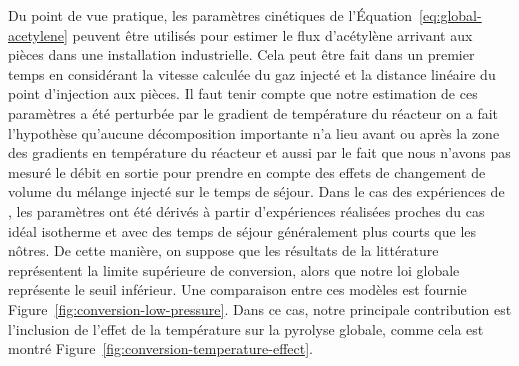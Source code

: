 \begin{table}[h]
  \caption{\label{tab:constantes-globales}Comparaison entre les paramètres de vitesse de décomposition de l'acétylène proposés par \citet{Norinaga2005} et dérivés de cette étude. Vitesse globale de décomposition $\dot{\omega}_{\ch{C2H2}}$ donnée en \si{\mole\per\cubic\centi\metre\per\second}.}
  
\end{table}

Du point de vue pratique, les paramètres cinétiques de l'Équation~\ref{eq:global-acetylene} peuvent être utilisés pour estimer le flux d'acétylène arrivant aux pièces dans une installation industrielle. Cela peut être fait dans un premier temps en considérant la vitesse calculée du gaz injecté et la distance linéaire du point d'injection aux pièces. Il faut tenir compte que notre estimation de ces paramètres a été perturbée par le gradient de température du réacteur \textendash{} on a fait l'hypothèse qu'aucune décomposition importante n'a lieu avant ou après la zone des gradients en température du réacteur \textendash{} et aussi par le fait que nous n'avons pas mesuré le débit en sortie pour prendre en compte des effets de changement de volume du mélange injecté sur le temps de séjour. Dans le cas des expériences de \citet{Norinaga2005}, les paramètres ont été dérivés à partir d'expériences réalisées proches du cas idéal isotherme et avec des temps de séjour généralement plus courts que les nôtres. De cette manière, on suppose que les résultats de la littérature~\cite{Norinaga2005} représentent la limite supérieure de conversion, alors que notre loi globale représente le seuil inférieur. Une comparaison entre ces modèles est fournie Figure~\ref{fig:conversion-low-pressure}. Dans ce cas, notre principale contribution est l'inclusion de l'effet de la température sur la pyrolyse globale, comme cela est montré Figure~\ref{fig:conversion-temperature-effect}.


